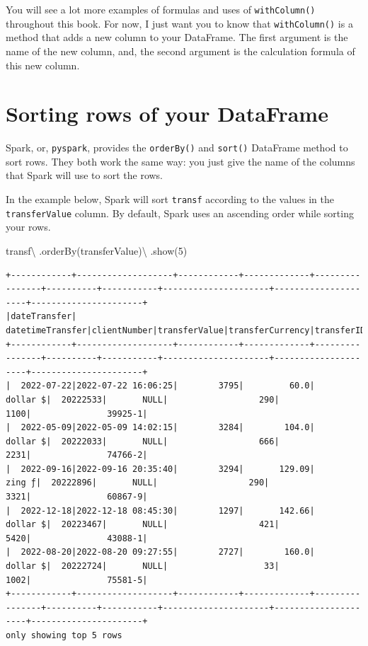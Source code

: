 \documentclass[
  11pt,
  letterpaper,
  DIV=11,
  numbers=noendperiod]{scrreprt}
\newenvironment{Shaded}{\begin{snugshade}}{\end{snugshade}}
\newcommand{\DecValTok}[1]{\textcolor[rgb]{0.68,0.00,0.00}{#1}}
\newcommand{\NormalTok}[1]{\textcolor[rgb]{0.00,0.23,0.31}{#1}}
\newcommand{\OperatorTok}[1]{\textcolor[rgb]{0.37,0.37,0.37}{#1}}
\newcommand{\StringTok}[1]{\textcolor[rgb]{0.13,0.47,0.30}{#1}}
\begin{document}
You will see a lot more examples of formulas and uses of
\texttt{withColumn()} throughout this book. For now, I just want you to
know that \texttt{withColumn()} is a method that adds a new column to
your DataFrame. The first argument is the name of the new column, and,
the second argument is the calculation formula of this new column.

\hypertarget{sorting-rows-of-your-dataframe}{%
\section{Sorting rows of your
DataFrame}\label{sorting-rows-of-your-dataframe}}

Spark, or, \texttt{pyspark}, provides the \texttt{orderBy()} and
\texttt{sort()} DataFrame method to sort rows. They both work the same
way: you just give the name of the columns that Spark will use to sort
the rows.

In the example below, Spark will sort \texttt{transf} according to the
values in the \texttt{transferValue} column. By default, Spark uses an
ascending order while sorting your rows.

\begin{Shaded}
\begin{Highlighting}[]
\NormalTok{transf}\OperatorTok{\textbackslash{}}
\NormalTok{  .orderBy(}\StringTok{\textquotesingle{}transferValue\textquotesingle{}}\NormalTok{)}\OperatorTok{\textbackslash{}}
\NormalTok{  .show(}\DecValTok{5}\NormalTok{)}
\end{Highlighting}
\end{Shaded}

\begin{verbatim}
+------------+-------------------+------------+-------------+----------------+----------+-----------+---------------------+---------------------+----------------------+
|dateTransfer|   datetimeTransfer|clientNumber|transferValue|transferCurrency|transferID|transferLog|destinationBankNumber|destinationBankBranch|destinationBankAccount|
+------------+-------------------+------------+-------------+----------------+----------+-----------+---------------------+---------------------+----------------------+
|  2022-07-22|2022-07-22 16:06:25|        3795|         60.0|        dollar $|  20222533|       NULL|                  290|                 1100|               39925-1|
|  2022-05-09|2022-05-09 14:02:15|        3284|        104.0|        dollar $|  20222033|       NULL|                  666|                 2231|               74766-2|
|  2022-09-16|2022-09-16 20:35:40|        3294|       129.09|          zing ƒ|  20222896|       NULL|                  290|                 3321|               60867-9|
|  2022-12-18|2022-12-18 08:45:30|        1297|       142.66|        dollar $|  20223467|       NULL|                  421|                 5420|               43088-1|
|  2022-08-20|2022-08-20 09:27:55|        2727|        160.0|        dollar $|  20222724|       NULL|                   33|                 1002|               75581-5|
+------------+-------------------+------------+-------------+----------------+----------+-----------+---------------------+---------------------+----------------------+
only showing top 5 rows
\end{verbatim}
\end{document}
